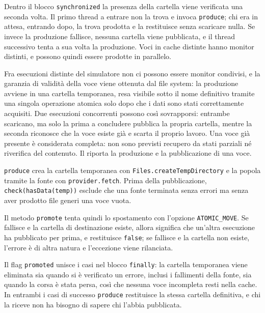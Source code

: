 Dentro il blocco \texttt{synchronized} la presenza della cartella viene verificata una
seconda volta. Il primo thread a entrare non la trova e invoca \texttt{produce}; chi era in
attesa, entrando dopo, la trova prodotta e la restituisce senza scaricare nulla. Se invece la
produzione fallisce, nessuna cartella viene pubblicata, e il thread successivo tenta a sua
volta la produzione. Voci in cache distinte hanno monitor distinti, e
possono quindi essere prodotte in parallelo.

Fra esecuzioni distinte del simulatore non ci possono essere monitor condivisi, e la garanzia
di validità della voce viene ottenuta dal file system: la produzione avviene in una cartella
temporanea, resa visibile sotto il nome definitivo tramite una singola operazione atomica solo dopo che i dati sono stati
correttamente acquisiti. Due esecuzioni concorrenti
possono così sovrapporsi: entrambe scaricano, ma solo la prima a concludere pubblica la
propria cartella, mentre la seconda riconosce che la voce esiste già e scarta il proprio
lavoro. Una voce già presente è considerata completa: non sono previsti recupero da stati
parziali né riverifica del contenuto. Il  riporta la produzione e la
pubblicazione di una voce.



\texttt{produce} crea la cartella temporanea con \texttt{Files.createTempDirectory}
e la popola tramite la fonte con \texttt{provider.fetch}.
Prima della pubblicazione, \texttt{check(hasData(temp))} esclude che
una fonte terminata senza errori ma senza aver prodotto file generi una voce vuota.

Il metodo \texttt{promote} tenta quindi lo spostamento con l'opzione \texttt{ATOMIC\_MOVE}. 
Se fallisce e la cartella di destinazione esiste, allora significa che un'altra
esecuzione ha pubblicato per prima, e restituisce \texttt{false}; se fallisce e la cartella
non esiste, l'errore è di altra natura e l'eccezione viene rilanciata.

Il flag \texttt{promoted} unisce i casi nel blocco \texttt{finally}: la cartella temporanea
viene eliminata sia quando si è verificato un errore, inclusi i fallimenti della fonte, sia
quando la corsa è stata persa, così che nessuna voce incompleta resti nella cache. In
entrambi i casi di successo \texttt{produce} restituisce la stessa cartella definitiva, e
chi la riceve non ha bisogno di sapere chi l'abbia pubblicata.

